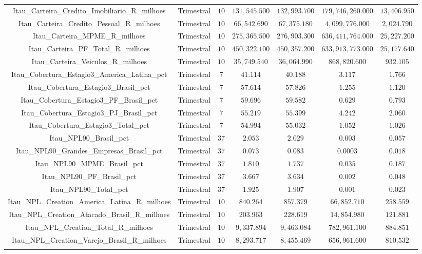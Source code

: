 \begin{table}[!htbp]
\begin{tabular}{@{\extracolsep{5pt}} ccccccc}
Itau\_Carteira\_Credito\_Imobiliario\_R\_milhoes & Trimestral & $10$ & $131,545.500$ & $132,993.700$ & $179,746,260.000$ & $13,406.950$ \\ 
Itau\_Carteira\_Credito\_Pessoal\_R\_milhoes & Trimestral & $10$ & $66,542.690$ & $67,375.180$ & $4,099,776.000$ & $2,024.790$ \\ 
Itau\_Carteira\_MPME\_R\_milhoes & Trimestral & $10$ & $275,365.500$ & $276,903.300$ & $636,411,764.000$ & $25,227.200$ \\ 
Itau\_Carteira\_PF\_Total\_R\_milhoes & Trimestral & $10$ & $450,322.100$ & $450,357.200$ & $633,913,773.000$ & $25,177.640$ \\ 
Itau\_Carteira\_Veiculos\_R\_milhoes & Trimestral & $10$ & $35,749.540$ & $36,064.990$ & $868,820.600$ & $932.105$ \\ 
Itau\_Cobertura\_Estagio3\_America\_Latina\_pct & Trimestral & $7$ & $41.114$ & $40.188$ & $3.117$ & $1.766$ \\ 
Itau\_Cobertura\_Estagio3\_Brasil\_pct & Trimestral & $7$ & $57.614$ & $57.826$ & $1.255$ & $1.120$ \\ 
Itau\_Cobertura\_Estagio3\_PF\_Brasil\_pct & Trimestral & $7$ & $59.696$ & $59.582$ & $0.629$ & $0.793$ \\ 
Itau\_Cobertura\_Estagio3\_PJ\_Brasil\_pct & Trimestral & $7$ & $55.219$ & $55.399$ & $4.242$ & $2.060$ \\ 
Itau\_Cobertura\_Estagio3\_Total\_pct & Trimestral & $7$ & $54.994$ & $55.032$ & $1.052$ & $1.026$ \\ 
Itau\_NPL90\_Brasil\_pct & Trimestral & $37$ & $2.053$ & $2.029$ & $0.003$ & $0.057$ \\ 
Itau\_NPL90\_Grandes\_Empresas\_Brasil\_pct & Trimestral & $37$ & $0.073$ & $0.083$ & $0.0003$ & $0.018$ \\ 
Itau\_NPL90\_MPME\_Brasil\_pct & Trimestral & $37$ & $1.810$ & $1.737$ & $0.035$ & $0.187$ \\ 
Itau\_NPL90\_PF\_Brasil\_pct & Trimestral & $37$ & $3.667$ & $3.634$ & $0.002$ & $0.048$ \\ 
Itau\_NPL90\_Total\_pct & Trimestral & $37$ & $1.925$ & $1.907$ & $0.001$ & $0.023$ \\ 
Itau\_NPL\_Creation\_America\_Latina\_R\_milhoes & Trimestral & $10$ & $840.264$ & $857.379$ & $66,852.710$ & $258.559$ \\ 
Itau\_NPL\_Creation\_Atacado\_Brasil\_R\_milhoes & Trimestral & $10$ & $203.963$ & $228.619$ & $14,854.980$ & $121.881$ \\ 
Itau\_NPL\_Creation\_Total\_R\_milhoes & Trimestral & $10$ & $9,337.894$ & $9,463.084$ & $782,961.100$ & $884.851$ \\ 
Itau\_NPL\_Creation\_Varejo\_Brasil\_R\_milhoes & Trimestral & $10$ & $8,293.717$ & $8,455.469$ & $656,961.600$ & $810.532$ \\ 
\hline \\[-1.8ex] 
\end{tabular} 
\end{table} 
